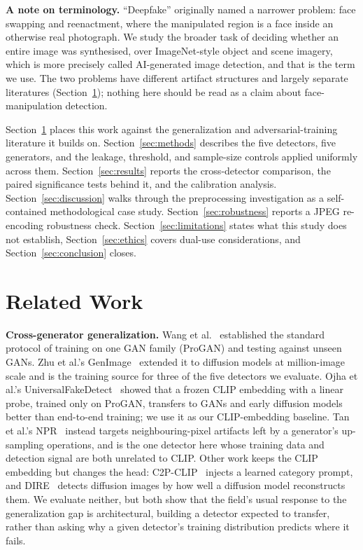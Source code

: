 \documentclass[3p,times,procedia]{elsarticle}
\begin{document}
\textbf{A note on terminology.} ``Deepfake'' originally named a narrower
problem: face swapping and reenactment, where the manipulated region is a
face inside an otherwise real photograph. We study the broader task of
deciding whether an entire image was synthesised, over ImageNet-style
object and scene imagery, which is more precisely called AI-generated image
detection, and that is the term we use. The two problems have different
artifact structures and largely separate literatures
(Section~\ref{sec:related}); nothing here should be read as a claim about
face-manipulation detection.

Section~\ref{sec:related} places this work against the generalization and
adversarial-training literature it builds on. Section~\ref{sec:methods}
describes the five detectors, five generators, and the leakage, threshold,
and sample-size controls applied uniformly across them.
Section~\ref{sec:results} reports the cross-detector comparison, the paired
significance tests behind it, and the calibration analysis.
Section~\ref{sec:discussion} walks through the preprocessing investigation
as a self-contained methodological case study.
Section~\ref{sec:robustness} reports a JPEG re-encoding robustness check.
Section~\ref{sec:limitations} states what this study does not establish,
Section~\ref{sec:ethics} covers dual-use considerations, and
Section~\ref{sec:conclusion} closes.

\section{Related Work}
\label{sec:related}

\textbf{Cross-generator generalization.} Wang et al.~\cite{wang2020cnndetect}
established the standard protocol of training on one GAN family (ProGAN)
and testing against unseen GANs. Zhu et al.'s GenImage~\cite{genimage2023}
extended it to diffusion models at million-image scale and is the training
source for three of the five detectors we evaluate. Ojha et al.'s
UniversalFakeDetect~\cite{ojha2023universal} showed that a frozen CLIP
embedding with a linear probe, trained only on ProGAN, transfers to GANs
and early diffusion models better than end-to-end training; we use it as
our CLIP-embedding baseline. Tan et al.'s NPR~\cite{tan2024npr} instead
targets neighbouring-pixel artifacts left by a generator's up-sampling
operations, and is the one detector here whose training data and detection
signal are both unrelated to CLIP. Other work keeps the CLIP embedding but
changes the head: C2P-CLIP~\cite{tan2025c2pclip} injects a learned category
prompt, and DIRE~\cite{wang2023dire} detects diffusion images by how well a
diffusion model reconstructs them. We evaluate neither, but both show that
the field's usual response to the generalization gap is architectural,
building a detector expected to transfer, rather than asking why a given
detector's training distribution predicts where it fails.
\end{document}
